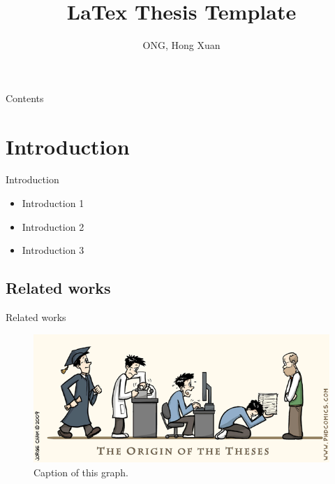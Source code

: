 \documentclass[11pt]{beamer}
\author{ONG, Hong Xuan}
\title{LaTex Thesis Template}
\institute{Japan Advanced Institute of Science And Technology}
\begin{document}
 
\begin{frame}
\titlepage %
\end{frame}
 
\begin{frame}{Contents}
\tableofcontents %
\end{frame}
 
\section{Introduction}
\begin{frame}{Introduction}
\begin{itemize}
\item Introduction 1
\item Introduction 2
\item Introduction 3
\end{itemize}
\end{frame}
 
\subsection{Related works}
\begin{frame}{Related works}
 
\begin{figure}[h!]
\includegraphics[width=0.9\linewidth]{charts/writing-thesis.png}
\caption{Caption of this graph.}
\label{fig:writing-thesis}
\end{figure}
\end{frame}
 
\end{document}
